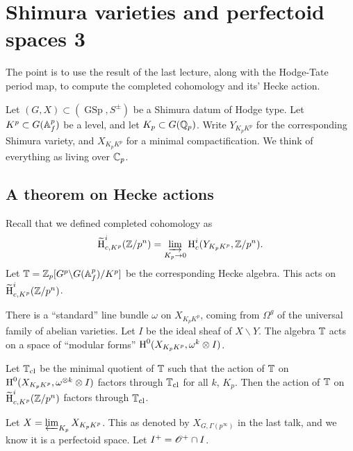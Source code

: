
\section{Shimura varieties and perfectoid spaces 3}





The point is to use the result of the last lecture, along with the Hodge-Tate period 
map, to compute the completed cohomology and its' Hecke action. 

Let $(G,X)\subset (\operatorname{GSp},S^\pm)$ be a Shimura datum of Hodge type. 
Let $K^p\subset G(\mathbb{A}_f^p)$ be a level, and let $K_p\subset G(\mathbb{Q}_p)$. Write 
$Y_{K_p K^p}$ for the corresponding Shimura variety, and 
$X_{K_p K^p}$ for a minimal compactification. We think of everything as living over 
$\mathbb{C}_p$. 





\subsection{A theorem on Hecke actions}

Recall that we defined completed cohomology as 
\[
  \widetilde {\operatorname{H}}_{c,K^p}^i(\mathbb{Z}/p^n) = \varinjlim_{K_p \to 0} \operatorname{H}_c^i(Y_{K_p K^p}, \mathbb{Z}/p^n) .
\]
Let $\mathbb{T} = \mathbb{Z}_p[G^p\backslash G(\mathbb{A}_f^p) / K^p]$ be the corresponding Hecke algebra. 
This acts on $\widetilde {\operatorname{H}}^i_{c,K^p}(\mathbb{Z}/p^n)$. 

There is a ``standard'' line bundle $\omega$ on $X_{K_p K^p}$, coming from 
$\Omega^g$ of the universal family of abelian varieties. Let $I$ be the ideal sheaf 
of $X\smallsetminus Y$. The algebra $\mathbb{T}$ acts on a space of ``modular forms'' 
$\operatorname{H}^0(X_{K_p K^p},\omega^k\otimes I)$. 

\begin{theorem}
Let $\mathbb{T}_\textnormal{cl}$ be the minimal quotient of $\mathbb{T}$ such that the action of 
$\mathbb{T}$ on $\operatorname{H}^0(X_{K_p K^p},\omega^{\otimes k}\otimes I)$ factors through 
$\mathbb{T}_\textnormal{cl}$ for all $k$, $K_p$. 
Then the action of $\mathbb{T}$ on $\widetilde{\operatorname{H}}_{c,K^p}^i(\mathbb{Z}/p^n)$ factors through 
$\mathbb{T}_\textnormal{cl}$. 
\end{theorem}

Let $X=\varprojlim_{K_p} X_{K_p K^p}$. This as denoted by 
$X_{G,\Gamma(p^\infty)}$ in the last talk, and we know it is a perfectoid space. 
Let $I^+=\mathscr{O}^+\cap I$. 

